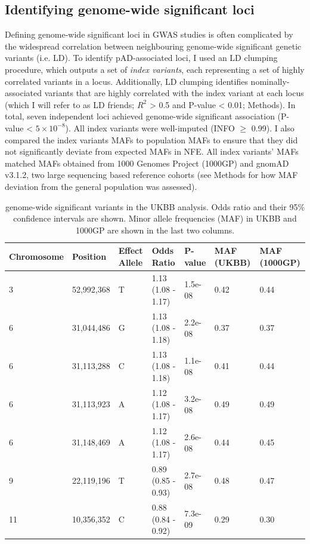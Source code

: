  \subsection{Identifying genome-wide significant loci}
  Defining genome-wide significant loci in GWAS studies is often complicated by the widespread correlation between neighbouring genome-wide significant genetic variants (i.e. LD). To identify pAD-associated loci, I used an LD clumping procedure, which outputs a set of \textit{index variants}, each representing a set of highly correlated variants in a locus. Additionally, LD clumping identifies nominally-associated variants that are highly correlated with the index variant at each locus (which I will refer to as LD friends; $R^{2}$ > 0.5 and P-value < 0.01; Methods). In total, seven independent loci achieved genome-wide significant association (P-value < $5\times10^{-8}$). All index variants were well-imputed (INFO $\geq$ 0.99). I also compared the index variants MAFs to population MAFs to ensure that they did not significantly deviate from expected MAFs in NFE. All index variants' MAFs matched MAFs obtained from 1000 Genomes Project (1000GP) and gnomAD v3.1.2, two large sequencing based reference cohorts (see Methods for how MAF deviation from the general population was assessed). 

  \begin{table}[htb]
    \centering\begingroup\fontsize{10}{14}\selectfont
    \caption{genome-wide significant variants in the UKBB analysis. Odds ratio and their 95\% confidence intervals are shown. Minor allele frequencies (MAF) in UKBB and 1000GP are shown in the last two columns.}
    \label{table:gws}
    \begin{tabular}[t]{|l|l|l|l|l|l|l|}
      \hline
      Chromosome & Position & Effect Allele & Odds Ratio & P-value & MAF (UKBB) & MAF (1000GP)\\
      \hline
      3 & 52,992,368 & T & 1.13 (1.08 - 1.17) & 1.5e-08 & 0.42 & 0.44\\
      \hline
      6 & 31,044,486 & G & 1.13 (1.08 - 1.18) & 2.2e-08 & 0.37 & 0.37\\
      \hline
      6 & 31,113,288 & C & 1.13 (1.08 - 1.18) & 1.1e-08 & 0.41 & 0.44\\
      \hline
      6 & 31,113,923 & A & 1.12 (1.08 - 1.17) & 3.2e-08 & 0.49 & 0.49\\
      \hline
      6 & 31,148,469 & A & 1.12 (1.08 - 1.17) & 2.6e-08 & 0.44 & 0.45\\
      \hline
      9 & 22,119,196 & T & 0.89 (0.85 - 0.93) & 2.7e-08 & 0.48 & 0.47\\
      \hline
      11 & 10,356,352 & C & 0.88 (0.84 - 0.92) & 7.3e-09 & 0.29 & 0.30\\
      \hline
      \end{tabular}

    \endgroup{}

    \end{table}

